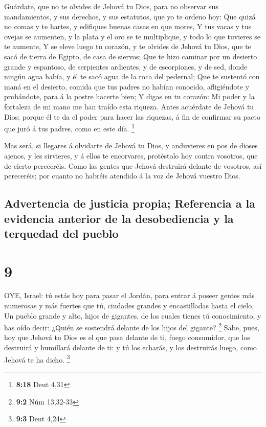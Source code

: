  Guárdate, que no te olvides de Jehová tu Dios, para no
observar sus mandamientos, y sus derechos, y sus estatutos, que yo te
ordeno hoy:  Que quizá no comas y te hartes, y edifiques
buenas casas en que mores,  Y tus vacas y tus ovejas se
aumenten, y la plata y el oro se te multiplique, y todo lo que tuvieres
se te aumente,  Y se eleve luego tu corazón, y te olvides
de Jehová tu Dios, que te sacó de tierra de Egipto, de casa de siervos;
 Que te hizo caminar por un desierto grande y espantoso, de
serpientes ardientes, y de escorpiones, y de sed, donde ningún agua
había, y él te sacó agua de la roca del pedernal;  Que te
sustentó con maná en el desierto, comida que tus padres no habían
conocido, afligiéndote y probándote, para á la postre hacerte bien;
 Y digas en tu corazón: Mi poder y la fortaleza de mi mano
me han traído esta riqueza.  Antes acuérdate de Jehová tu
Dios: porque él te da el poder para hacer las riquezas, á fin de
confirmar su pacto que juró á tus padres, como en este día. \footnote{\textbf{8:18}
  Deut 4,31}

 Mas será, si llegares á olvidarte de Jehová tu Dios, y
anduvieres en pos de dioses ajenos, y les sirvieres, y á ellos te
encorvares, protéstolo hoy contra vosotros, que de cierto pereceréis.
 Como las gentes que Jehová destruirá delante de vosotros,
así pereceréis; por cuanto no habréis atendido á la voz de Jehová
vuestro Dios.

\hypertarget{advertencia-de-justicia-propia-referencia-a-la-evidencia-anterior-de-la-desobediencia-y-la-terquedad-del-pueblo}{%
\subsection{Advertencia de justicia propia; Referencia a la evidencia
anterior de la desobediencia y la terquedad del
pueblo}\label{advertencia-de-justicia-propia-referencia-a-la-evidencia-anterior-de-la-desobediencia-y-la-terquedad-del-pueblo}}

\hypertarget{section-8}{%
\section{9}\label{section-8}}

 OYE, Israel: tú estás hoy para pasar el Jordán, para entrar
á poseer gentes más numerosas y más fuertes que tú, ciudades grandes y
encastilladas hasta el cielo,  Un pueblo grande y alto,
hijos de gigantes, de los cuales tienes tú conocimiento, y has oído
decir: ¿Quién se sostendrá delante de los hijos del gigante? \footnote{\textbf{9:2}
  Núm 13,32-33}  Sabe, pues, hoy que Jehová tu Dios es el
que pasa delante de ti, fuego consumidor, que los destruirá y humillará
delante de ti: y tú los echarás, y los destruirás luego, como Jehová te
ha dicho. \footnote{\textbf{9:3} Deut 4,24}

